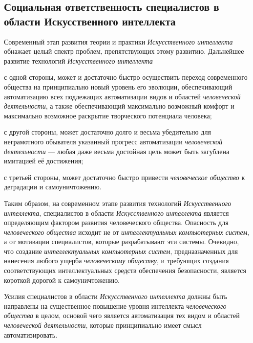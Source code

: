 \subsection*{Социальная ответственность специалистов в области Искусственного интеллекта}
Современный этап развития теории и практики \textit{Искусственного интеллекта} обнажает целый спектр проблем, препятствующих этому развитию. Дальнейшее развитие технологий \textit{Искусственного интеллекта}
\begin{textitemize}
	\item с одной стороны, может и достаточно быстро осуществить переход современного общества на принципиально новый уровень его эволюции, обеспечивающий  автоматизацию всех подлежащих автоматизации видов и областей \textit{человеческой деятельности}, а также обеспечивающий максимально возможный комфорт и максимально возможное раскрытие творческого потенциала  человека;
	\item с другой стороны, может достаточно долго и весьма убедительно для неграмотного обывателя  указанный прогресс автоматизации \textit{человеческой деятельности} --- любая даже весьма достойная цель может быть загублена имитацией её достижения;
	\item с третьей стороны, может достаточно быстро привести \textit{человеческое общество} к деградации и самоуничтожению.
\end{textitemize}

Таким образом, на современном этапе развития технологий \textit{Искусственного интеллекта},   специалистов в области\textit{ Искусственного интеллекта} является определяющим фактором развития человеческого общества. Опасность для \textit{человеческого общества} исходит не от \textit{интеллектуальных компьютерных систем}, а от мотивации специалистов, которые разрабатывают эти системы. Очевидно, что создание \textit{интеллектуальных компьютерных систем}, предназначенных для  нанесения любого ущерба \textit{человеческому обществу}, и требующих создания соответствующих интеллектуальных средств обеспечения безопасности, является короткой дорогой к самоуничтожению.

Усилия специалистов в области \textit{Искусственного интеллекта} должны быть направлены на существенное повышение уровня интеллекта \textit{человеческого общества} в целом, основой чего является  автоматизация  тех видом и областей \textit{человеческой деятельности}, которые принципиально имеет смысл автоматизировать.

